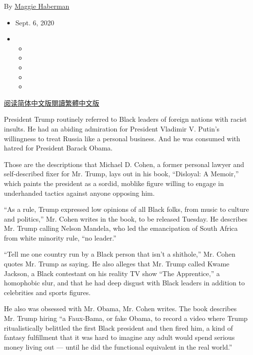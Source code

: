 By \href{https://www.nytimes3xbfgragh.onion/by/maggie-haberman}{Maggie
Haberman}

\begin{itemize}
\item
  Sept. 6, 2020
\item
  \begin{itemize}
  \item
  \item
  \item
  \item
  \item
  \end{itemize}
\end{itemize}

\href{https://cn.nytimes3xbfgragh.onion/usa/20200909/cohen-book-trump/}{阅读简体中文版}\href{https://cn.nytimes3xbfgragh.onion/usa/20200909/cohen-book-trump/zh-hant/}{閱讀繁體中文版}

President Trump routinely referred to Black leaders of foreign nations
with racist insults. He had an abiding admiration for President Vladimir
V. Putin's willingness to treat Russia like a personal business. And he
was consumed with hatred for President Barack Obama.

Those are the descriptions that Michael D. Cohen, a former personal
lawyer and self-described fixer for Mr. Trump, lays out in his book,
``Disloyal: A Memoir,'' which paints the president as a sordid, moblike
figure willing to engage in underhanded tactics against anyone opposing
him.

``As a rule, Trump expressed low opinions of all Black folks, from music
to culture and politics,'' Mr. Cohen writes in the book, to be released
Tuesday. He describes Mr. Trump calling Nelson Mandela, who led the
emancipation of South Africa from white minority rule, ``no leader.''

``Tell me one country run by a Black person that isn't a shithole,'' Mr.
Cohen quotes Mr. Trump as saying. He also alleges that Mr. Trump called
Kwame Jackson, a Black contestant on his reality TV show ``The
Apprentice,'' a homophobic slur, and that he had deep disgust with Black
leaders in addition to celebrities and sports figures.

He also was obsessed with Mr. Obama, Mr. Cohen writes. The book
describes Mr. Trump hiring ``a Faux-Bama, or fake Obama, to record a
video where Trump ritualistically belittled the first Black president
and then fired him, a kind of fantasy fulfillment that it was hard to
imagine any adult would spend serious money living out --- until he did
the functional equivalent in the real world.''

